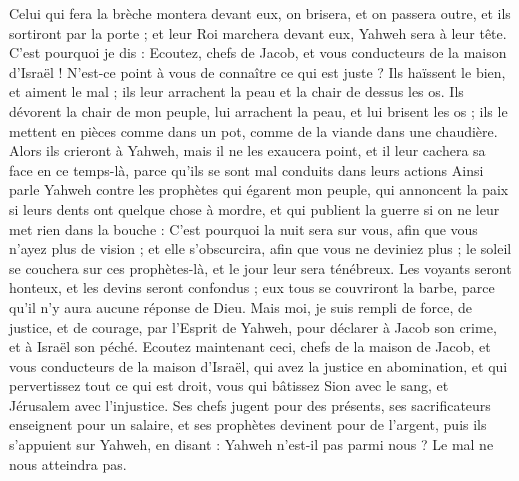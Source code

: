 \begin{multicols}{2}
Celui qui fera la brèche montera  devant eux, on brisera, et on passera outre, et ils sortiront par la porte ; et leur Roi marchera devant eux, Yahweh sera à leur tête.
\VerseOne{}C'est pourquoi je dis : Ecoutez, chefs de Jacob, et vous conducteurs de la maison d'Israël ! N'est-ce point à vous de connaître ce qui est juste ?
Ils haïssent le bien, et aiment le mal ; ils leur arrachent la peau et la chair de dessus les os.
Ils dévorent la chair de mon peuple, lui arrachent la peau, et lui brisent les os ; ils le mettent en pièces comme dans un pot, comme de la viande dans une chaudière.
Alors ils crieront à Yahweh, mais il ne les exaucera point, et il leur cachera sa face en ce temps-là, parce qu’ils se sont mal conduits dans leurs actions
Ainsi parle Yahweh contre les prophètes qui égarent mon peuple, qui annoncent la paix si leurs dents ont quelque chose à mordre, et qui publient la guerre si on ne leur met rien dans la bouche :
C'est pourquoi la nuit sera sur vous, afin que vous n'ayez plus de vision ; et elle s'obscurcira, afin que vous ne deviniez plus ; le soleil se couchera sur ces prophètes-là, et le jour leur sera ténébreux.
Les voyants seront honteux, et les devins seront confondus ; eux tous se couvriront la barbe, parce qu'il n'y aura aucune réponse de Dieu.
Mais moi, je suis rempli de force, de justice, et de courage, par l'Esprit de Yahweh, pour déclarer à Jacob son crime, et à Israël son péché.
Ecoutez maintenant ceci, chefs de la maison de Jacob, et vous conducteurs de la maison d'Israël, qui avez la justice en abomination, et qui pervertissez tout ce qui est droit,
vous qui bâtissez Sion avec le sang, et Jérusalem avec l'injustice.
Ses chefs jugent pour des présents, ses sacrificateurs enseignent pour un salaire, et ses prophètes devinent pour de l'argent, puis ils s'appuient sur Yahweh, en disant : Yahweh n'est-il pas parmi nous ? Le mal ne nous atteindra pas.

\end{multicols}
